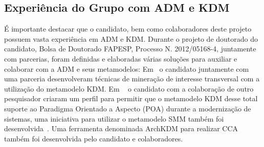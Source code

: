 \documentclass[12pt]{article}
\begin{document}


\subsection{Experiência do Grupo com ADM e KDM}

É importante destacar que o candidato, bem como colaboradores deste projeto possuem vasta experiência em ADM e KDM. Durante o projeto de doutorado do candidato, Bolsa de Doutorado FAPESP, Processo N. 2012/05168-4, juntamente com parcerias, foram definidas e elaboradas várias soluções para auxiliar e colaborar com a ADM e seus metamodelos: Em~\cite{dani_san_tool, dani_san, daniel_san_journal} o candidato juntamente com uma parceria desenvolveram técnicas de mineração de interesse transversal com a utilização do metamodelo KDM. Em ~\cite{Santos_2014, santo_wmod} o candidato com a colaboração de outro pesquisador criaram um perfil para permitir que o metamodelo KDM desse total suporte ao Paradigma Orientado a Aspecto (POA) durante a modernização de sistemas, uma iniciativa para utilizar o metamodelo SMM também foi desenvolvida~\cite{honda_dissertacao}.  Uma ferramenta denominada ArchKDM para realizar CCA também foi desenvolvida pelo candidato e colaboradores.
\end{document}
